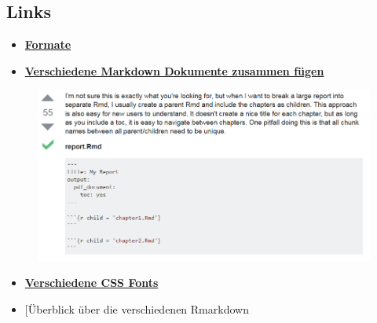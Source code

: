 \documentclass[]{article}
\providecommand{\tightlist}{%
  \setlength{\itemsep}{0pt}\setlength{\parskip}{0pt}}
\begin{document}
\subsection{Links}\label{links}

\begin{itemize}
\tightlist
\item
  \href{http://rmarkdown.rstudio.com/formats.html}{\textbf{Formate}}
\item
  \href{http://stackoverflow.com/questions/25824795/how-to-combine-two-rmarkdown-rmd-files-into-a-single-output}{\textbf{Verschiedene
  Markdown Dokumente zusammen fügen}}
\end{itemize}

\begin{figure}
\centering
\includegraphics{figure/stackoverflowCombine.PNG}
\caption{}
\end{figure}

\begin{itemize}
\item
  \href{http://www.cssfontstack.com/}{\textbf{Verschiedene CSS Fonts}}
\item
  {[}Überblick über die verschiedenen Rmarkdown
\end{itemize}
\end{document}
